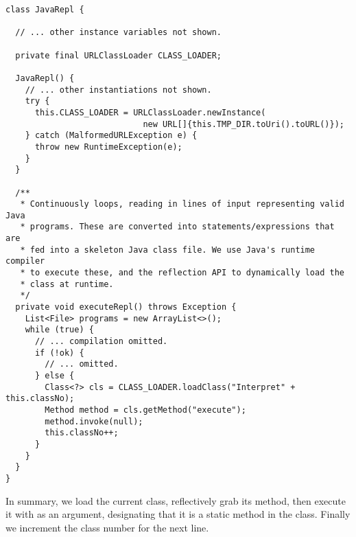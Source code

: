 \enlargethispage{-1\baselineskip}
\begin{lstlisting}[language=MyJava]
class JavaRepl {

  // ... other instance variables not shown.

  private final URLClassLoader CLASS_LOADER;

  JavaRepl() {
    // ... other instantiations not shown.
    try {
      this.CLASS_LOADER = URLClassLoader.newInstance(
                            new URL[]{this.TMP_DIR.toUri().toURL()});
    } catch (MalformedURLException e) {
      throw new RuntimeException(e);
    }
  }

  /**
   * Continuously loops, reading in lines of input representing valid Java
   * programs. These are converted into statements/expressions that are
   * fed into a skeleton Java class file. We use Java's runtime compiler 
   * to execute these, and the reflection API to dynamically load the 
   * class at runtime.
   */
  private void executeRepl() throws Exception {
    List<File> programs = new ArrayList<>();
    while (true) {
      // ... compilation omitted.
      if (!ok) {
        // ... omitted.
      } else {
        Class<?> cls = CLASS_LOADER.loadClass("Interpret" + this.classNo);
        Method method = cls.getMethod("execute");
        method.invoke(null);
        this.classNo++;
      }
    }
  }
}
\end{lstlisting}

In summary, we load the current class, reflectively grab its  method, then execute it with  as an argument, designating that it is a static method in the class. 
Finally we increment the class number for the next line.
